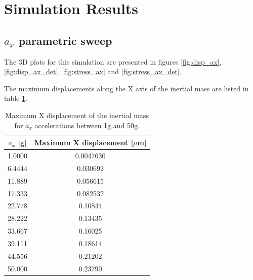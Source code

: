 \documentclass[lettersize,journal]{IEEEtran}
\begin{document}
    \section{Simulation Results}
    \subsection{\(a_x\) parametric sweep}\label{sse:ax_sweep_results}
    The 3D plots for this simulation are presented in figures \ref{fig:disp_ax}, \ref{fig:disp_ax_det}, \ref{fig:stress_ax} and \ref{fig:stress_ax_det}.
    
    The maximum displacements along the X axis of the inertial mass are listed in table \ref{tab:max_x_disp}.
    
    \begin{table}[h]
        \caption{Maximum X displacement of the inertial mass for \(a_x\) accelerations between 1g and 50g.}
        \renewcommand{\arraystretch}{1.5}
        \centering
        \begin{tabular}{|c|c|}
            \hline
            \textbf{\(a_x\) [g]} & \textbf{Maximum X displacement [\(\mu\)m]} \\ \hline
            1.0000       & 0.0047630                 \\ \hline
            6.4444       & 0.030692                \\ \hline
            11.889       & 0.056615                \\ \hline
            17.333       & 0.082532                 \\ \hline
            22.778       & 0.10844                 \\ \hline
            28.222       & 0.13435                 \\ \hline
            33.667       & 0.16025                 \\ \hline
            39.111       & 0.18614                 \\ \hline
            44.556       & 0.21202                 \\ \hline
            50.000       & 0.23790                 \\ \hline
        \end{tabular}
        \label{tab:max_x_disp}
    \end{table}
    
\end{document}
